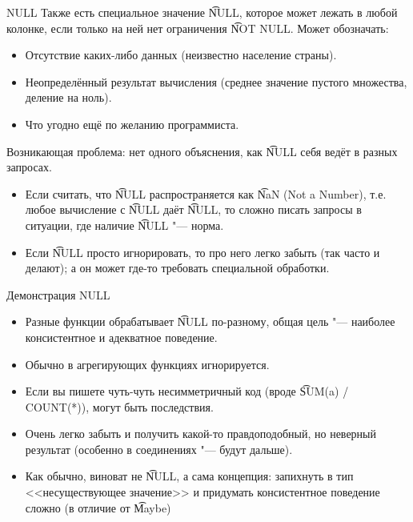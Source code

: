 \begin{frame}{NULL}
	Также есть специальное значение \t{NULL}, которое может лежать в любой колонке, если только на ней нет ограничения \t{NOT NULL}.
	Может обозначать:
	\begin{itemize}
		\item Отсутствие каких-либо данных (неизвестно население страны).
		\item Неопределённый результат вычисления (среднее значение пустого множества, деление на ноль).
		\item Что угодно ещё по желанию программиста.
	\end{itemize}
	Возникающая проблема: нет одного объяснения, как \t{NULL} себя ведёт в разных запросах.
	\begin{itemize}
		\item
			Если считать, что \t{NULL} распространяется как \t{NaN} (Not a Number), т.е. любое вычисление с \t{NULL} даёт \t{NULL},
			то сложно писать запросы в ситуации, где наличие \t{NULL} "--- норма.
		\item
			Если \t{NULL} просто игнорировать, то про него легко забыть (так часто и делают); а он может где-то требовать специальной обработки.
	\end{itemize}
\end{frame}

\begin{frame}{Демонстрация NULL}
    \begin{itemize}
    	\item Разные функции обрабатывает \t{NULL} по-разному, общая цель "--- наиболее консистентное и адекватное поведение.
    	\item Обычно в агрегирующих функциях игнорируется.
    	\item Если вы пишете чуть-чуть несимметричный код (вроде \t{SUM(a) / COUNT(*)}), могут быть последствия.
    	\item Очень легко забыть и получить какой-то правдоподобный, но неверный результат (особенно в соединениях "--- будут дальше).
    	\item Как обычно, виноват не \t{NULL}, а сама концепция: запихнуть в тип <<несуществующее значение>> и придумать консистентное поведение сложно
    	      (в отличие от \t{Maybe})
    \end{itemize}
\end{frame}

